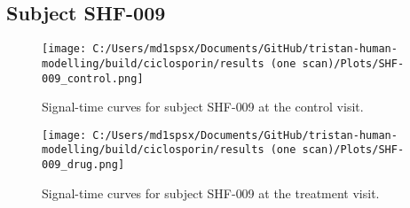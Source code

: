 \documentclass{epflreport}%
\begin{document}
\subsection{Subject SHF{-}009}%
\label{subsec:SubjectSHF{-}009}%

%


\begin{figure}[h!]%
\centering%
\texttt{[image: C:/Users/md1spsx/Documents/GitHub/tristan-human-modelling/build/ciclosporin/results (one scan)/Plots/SHF-009\_control.png]}%
\caption{Signal{-}time curves for subject SHF{-}009 at the control visit.}%
\end{figure}

%


\begin{figure}[h!]%
\centering%
\texttt{[image: C:/Users/md1spsx/Documents/GitHub/tristan-human-modelling/build/ciclosporin/results (one scan)/Plots/SHF-009\_drug.png]}%
\caption{Signal{-}time curves for subject SHF{-}009 at the treatment visit.}%
\end{figure}
\end{document}
